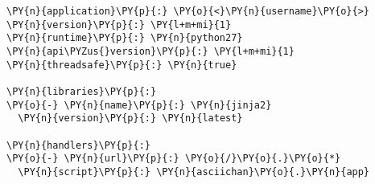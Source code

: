 \begin{Verbatim}[commandchars=\\\{\}]
\PY{n}{application}\PY{p}{:} \PY{o}{<}\PY{n}{username}\PY{o}{>}
\PY{n}{version}\PY{p}{:} \PY{l+m+mi}{1}
\PY{n}{runtime}\PY{p}{:} \PY{n}{python27}
\PY{n}{api\PYZus{}version}\PY{p}{:} \PY{l+m+mi}{1}
\PY{n}{threadsafe}\PY{p}{:} \PY{n}{true}

\PY{n}{libraries}\PY{p}{:}
\PY{o}{-} \PY{n}{name}\PY{p}{:} \PY{n}{jinja2}
  \PY{n}{version}\PY{p}{:} \PY{n}{latest}

\PY{n}{handlers}\PY{p}{:}
\PY{o}{-} \PY{n}{url}\PY{p}{:} \PY{o}{/}\PY{o}{.}\PY{o}{*}
  \PY{n}{script}\PY{p}{:} \PY{n}{asciichan}\PY{o}{.}\PY{n}{app}
\end{Verbatim}
